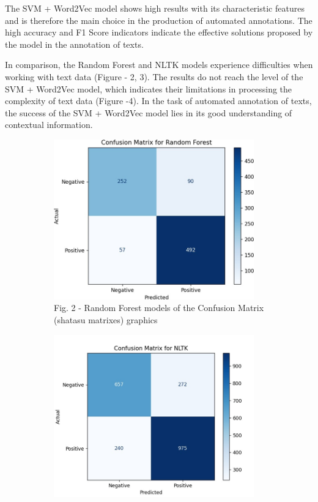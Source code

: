 \begin{multicols}{2}
The SVM + Word2Vec model shows high results with its characteristic
features and is therefore the main choice in the production of automated
annotations. The high accuracy and F1 Score indicators indicate the
effective solutions proposed by the model in the annotation of texts.

In comparison, the Random Forest and NLTK models experience difficulties
when working with text data (Figure - 2, 3). The results do not reach
the level of the SVM + Word2Vec model, which indicates their limitations
in processing the complexity of text data (Figure -4). In the task of
automated annotation of texts, the success of the SVM + Word2Vec model
lies in its good understanding of contextual information.
\end{multicols}

\begin{figure}[H]
    \centering
    \begin{subfigure}{0.45\textwidth}
        \centering
        \includegraphics[width=0.95\textwidth]{media/ict/image23}
        \caption*{Fig. 2 - Random Forest models of the Confusion Matrix (shatasu matrixes) graphics}
    \end{subfigure}
    \hfill
    \begin{subfigure}{0.47\textwidth}
        \centering
        \includegraphics[width=0.95\textwidth]{media/ict/image24}

\end{subfigure}
\end{figure}
